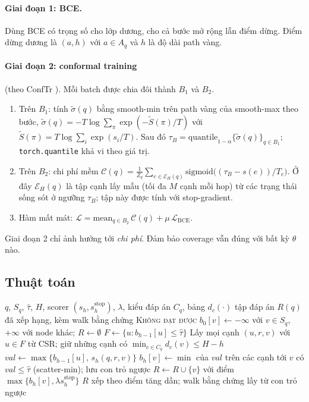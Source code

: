 \documentclass[11pt,a4paper]{article}
\theoremstyle{remark}
\newcommand{\Aq}{A_q}
\newcommand{\Sq}{S_q}
\newcommand{\tauhat}{\hat{\tau}}
\newcommand{\method}{\textsc{CHASE}}
\begin{document}
\paragraph{Giai đoạn 1: BCE.} Dùng BCE có trọng số cho lớp dương, cho cả bước mở rộng lẫn điểm dừng. Điểm dừng dương là $(a,h)$ với $a\in\Aq$ và $h$ là độ dài path vàng.

\paragraph{Giai đoạn 2: conformal training} (theo ConfTr \cite{conftr}). Mỗi batch được chia đôi thành $B_1$ và $B_2$.
\begin{enumerate}[nosep]
  \item Trên $B_1$: tính $\tilde\sigma(q)$ bằng smooth-min trên path vàng của smooth-max theo bước, $\tilde\sigma(q)=-T\log\sum_{\pi}\exp(-\widetilde{S}(\pi)/T)$ với $\widetilde{S}(\pi)=T\log\sum_i\exp(s_i/T)$. Sau đó $\tau_B=\mathrm{quantile}_{1-\alpha}\{\tilde\sigma(q)\}_{q\in B_1}$; \texttt{torch.quantile} khả vi theo giá trị.
  \item Trên $B_2$: chi phí mềm $\mathcal{C}(q)=\frac{1}{Z_q}\sum_{e\in\mathcal{E}_H(q)}\mathrm{sigmoid}\big((\tau_B-s(e))/T_c\big)$. Ở đây $\mathcal{E}_H(q)$ là tập cạnh lấy mẫu (tối đa $M$ cạnh mỗi hop) từ các trạng thái sống sót ở ngưỡng $\tau_B$; tập này được tính với stop-gradient.
  \item Hàm mất mát: $\mathcal{L}=\mathrm{mean}_{q\in B_2}\,\mathcal{C}(q)+\mu\,\mathcal{L}_{\mathrm{BCE}}$.
\end{enumerate}
Giai đoạn 2 chỉ ảnh hưởng tới \emph{chi phí}. Đảm bảo coverage vẫn đúng với bất kỳ $\theta$ nào.

\subsection{Thuật toán}
\begin{algorithm}[h]
\caption{\method: search theo ngưỡng bằng bottleneck DP (lúc test)}
\begin{algorithmic}[1]
\Require $q$, $\Sq$, $\tauhat$, $H$, scorer $(s_h,s^{\mathrm{stop}}_h)$, $\lambda$, kiểu đáp án $C_q$, bảng $d_c(\cdot)$
\Ensure tập đáp án $R(q)$ đã xếp hạng, kèm walk bằng chứng
\If{$\tauhat=+\infty$} \Return \textsc{Không đạt được} \EndIf
\State $b_0[v]\gets-\infty$ với $v\in\Sq$, $+\infty$ với node khác; \quad $R\gets\emptyset$
  \State $F\gets\{u: b_{h-1}[u]\le\tauhat\}$ 
  \State Lấy mọi cạnh $(u,r,v)$ với $u\in F$ từ CSR; giữ những cạnh có $\min_{c\in C_q}d_c(v)\le H-h$
  \State $\mathit{val}\gets\max\{b_{h-1}[u],\,s_h(q,r,v)\}$ 
  \State $b_h[v]\gets\min$ của $\mathit{val}$ trên các cạnh tới $v$ có $\mathit{val}\le\tauhat$ (scatter-min); lưu con trỏ ngược
  \ForAll{$v$ với $b_h[v]\le\tauhat$, $\mathrm{type}(v)\in C_q$}
    \If{$\lambda s^{\mathrm{stop}}_h(q,v)\le\tauhat$} $R\gets R\cup\{v\}$ với điểm $\max\{b_h[v],\lambda s^{\mathrm{stop}}_h\}$ \EndIf
  \EndFor
\EndFor
\State \Return $R$ xếp theo điểm tăng dần; walk bằng chứng lấy từ con trỏ ngược
\end{algorithmic}
\end{algorithm}
\end{document}
